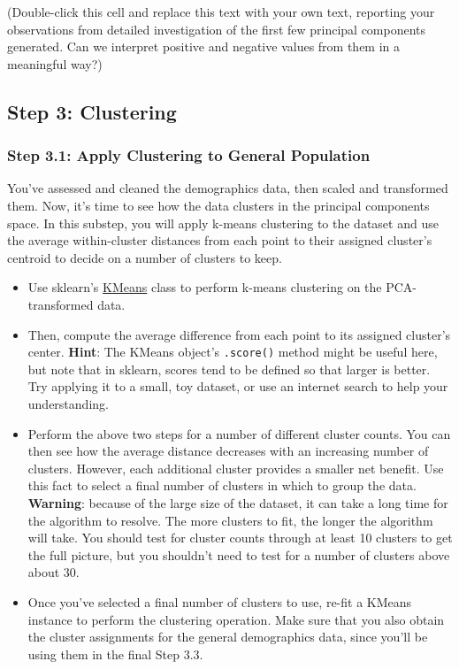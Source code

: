 \documentclass[11pt]{article}
\providecommand{\tightlist}{%
      \setlength{\itemsep}{0pt}\setlength{\parskip}{0pt}}
\begin{document}
(Double-click this cell and replace this text with your own text,
reporting your observations from detailed investigation of the first few
principal components generated. Can we interpret positive and negative
values from them in a meaningful way?)

    \hypertarget{step-3-clustering}{%
\subsection{Step 3: Clustering}\label{step-3-clustering}}

\hypertarget{step-3.1-apply-clustering-to-general-population}{%
\subsubsection{Step 3.1: Apply Clustering to General
Population}\label{step-3.1-apply-clustering-to-general-population}}

You've assessed and cleaned the demographics data, then scaled and
transformed them. Now, it's time to see how the data clusters in the
principal components space. In this substep, you will apply k-means
clustering to the dataset and use the average within-cluster distances
from each point to their assigned cluster's centroid to decide on a
number of clusters to keep.

\begin{itemize}
\tightlist
\item
  Use sklearn's
  \href{http://scikit-learn.org/stable/modules/generated/sklearn.cluster.KMeans.html\#sklearn.cluster.KMeans}{KMeans}
  class to perform k-means clustering on the PCA-transformed data.
\item
  Then, compute the average difference from each point to its assigned
  cluster's center. \textbf{Hint}: The KMeans object's \texttt{.score()}
  method might be useful here, but note that in sklearn, scores tend to
  be defined so that larger is better. Try applying it to a small, toy
  dataset, or use an internet search to help your understanding.
\item
  Perform the above two steps for a number of different cluster counts.
  You can then see how the average distance decreases with an increasing
  number of clusters. However, each additional cluster provides a
  smaller net benefit. Use this fact to select a final number of
  clusters in which to group the data. \textbf{Warning}: because of the
  large size of the dataset, it can take a long time for the algorithm
  to resolve. The more clusters to fit, the longer the algorithm will
  take. You should test for cluster counts through at least 10 clusters
  to get the full picture, but you shouldn't need to test for a number
  of clusters above about 30.
\item
  Once you've selected a final number of clusters to use, re-fit a
  KMeans instance to perform the clustering operation. Make sure that
  you also obtain the cluster assignments for the general demographics
  data, since you'll be using them in the final Step 3.3.
\end{itemize}
\end{document}
